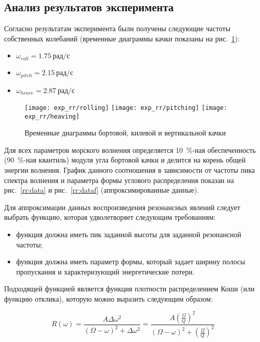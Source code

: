 \subsection{Анализ результатов эксперимента}

Согласно результатам эксперимента были получены следующие частоты собственных колебаний (временные диаграммы качки показаны на рис.~\ref{exp_rr_rolling}):
\begin{itemize}
	\item	$ \omega_{roll} = 1.75\ \text{рад/с}$
	\item	$ \omega_{pitch} = 2.15\ \text{рад/с}$
	\item	$ \omega_{heave} = 2.87\ \text{рад/с}$
\end{itemize}

\begin{figure}[ht]
	\begin{center}
	\texttt{[image: exp\_rr/rolling]}
	\texttt{[image: exp\_rr/pitching]}
	\texttt{[image: exp\_rr/heaving]}
	\end{center}
	\caption{Временные диаграммы бортовой, килевой и вертикальной качки}
	\label{exp_rr_rolling}
\end{figure}

Для всех параметров морского волнения определяется 10~\%-ная обеспеченность (90~\%-ная квантиль) модуля угла бортовой качки и делится на корень общей энергии волнения. График данного соотношения в зависимости от частоты пика спектра волнения и параметра формы углового распределения показан на рис.~\ref{rr:data} и рис.~\ref{rr:dataf} (аппроксимированные данные).

Для аппроксимации данных воспроизведения резонансных явлений следует выбрать функцию, которая удволетворяет следующим требованиям: 
\begin{itemize}
	\item	функция должна иметь пик заданной высоты для заданной резонансной частоты;
	\item	функция должна иметь параметр формы, который задает ширину полосы пропускания и характеризующий
			энергетические потери.  
\end{itemize} 

Подходящей функцией является функция плотности распределением Коши (или функцию отклика), которую можно выразить следующим образом:

\begin{equation}
	R(\omega) = \frac{A \Delta \omega^2} {  (\Omega-\omega)^2 + \Delta \omega^2 } 
		 = \frac{A \left( \frac{\Omega}{Q} \right) ^2} {  (\Omega-\omega)^2 + \left( \frac{\Omega}{Q} \right) ^2 } 
\label{cauchy}
\end{equation}

